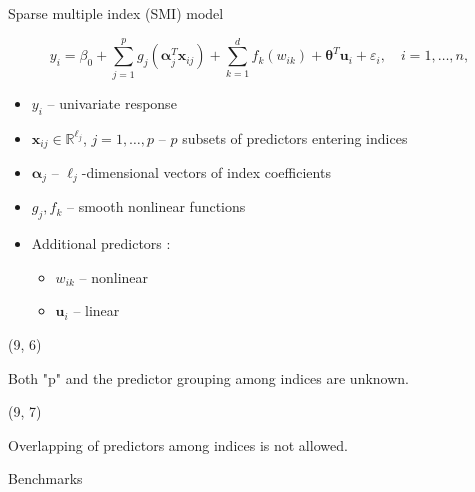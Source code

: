 \documentclass[
  12pt,
  ignorenonframetext,
  aspectratio=169,
]{beamer}
\begin{document}
\begin{frame}{Sparse multiple index (SMI) model}
\label{sparse-multiple-index-smi-model-2}
\begin{block}{}
$$y_{i} = \beta_{0} + \sum_{j = 1}^{p}g_{j}(\bm{\alpha}_{j}^{T}\bm{x}_{ij}) + \sum_{k = 1}^{d}f_{k}(w_{ik}) + \bm{\theta}^{T}\bm{u}_{i} + \varepsilon_{i}, \quad i = 1, \dots, n,$$
\end{block}

\begin{itemize}
  \item \small \color{black} $y_{i}$ -- \color{violet} univariate response
  \item \small \color{black} $\bm{x}_{ij} \in \mathbb{R}^{\ell_{j}}$, $j = 1, \dots, p$ -- \color{violet} $p$ subsets of predictors entering indices
  \item \small \color{black} $\bm{\alpha}_{j}$ -- \color{violet} $\ell_{j}$-dimensional vectors of index coefficients
  \item \small \color{black} $g_{j}, f_{k}$ -- \color{violet} smooth nonlinear functions
  \item \small \color{black} Additional predictors :
    \begin{itemize}
      \item \small $w_{ik}$  --   \color{violet} nonlinear 
      \item \small \color{black} $\bm{u}_{i}$  --   \color{violet} linear
    \end{itemize}
\end{itemize}

\begin{textblock}{5.5}(9, 6)
\fontsize{11}{12}\sf
\begin{alertblock}{}
\scriptsize Both "p" and the predictor grouping among indices are unknown.
\end{alertblock}
\end{textblock}

\begin{textblock}{5.5}(9, 7)
\fontsize{11}{12}\sf
\begin{alertblock}{}
\scriptsize Overlapping of predictors among indices is not allowed.
\end{alertblock}
\end{textblock}
\end{frame}

\begin{frame}{Benchmarks}
\label{benchmarks}
\end{frame}
\end{document}
